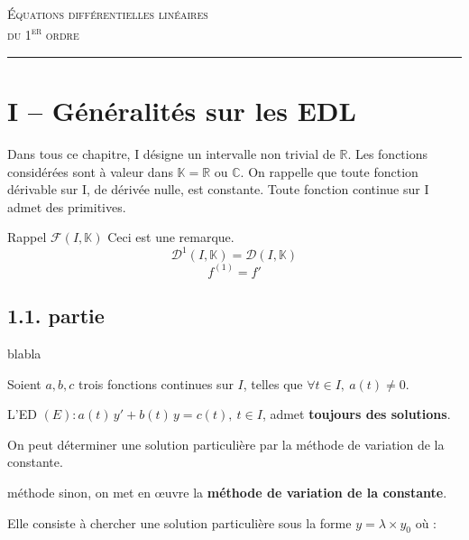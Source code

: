 \documentclass[a4paper,11pt]{article}
\newcommand{\mot}[1]{\textcolor{bordeaux}{\textbf{#1}}}
\begin{document}
\begin{center}
  {\LARGE\scshape\color{bordeaux} Équations différentielles linéaires\\[2pt] du 1\textsuperscript{er} ordre}\\[2pt]
  {\color{brun}\rule{0.45\linewidth}{0.8pt}}
\end{center}


\section*{I -- Généralités sur les EDL}
Dans tous ce chapitre, I désigne un intervalle non trivial de $\mathbb{R}$. 
Les fonctions considérées sont à valeur dans $\mathbb{K}=\mathbb{R}$ ou $\mathbb{C}$.
On rappelle que toute fonction dérivable sur I, de dérivée nulle, est constante. Toute fonction continue sur I admet des primitives.

\begin{remarque}{Rappel}
$\mathscr{F}(I,\mathbb{K})$ Ceci est une remarque.
\\

$$\mathscr{D}^{1}(I,\mathbb{K})=\mathscr{D}(I,\mathbb{K})$$
$$f^{(1)}=f'$$


\end{remarque}

\subsection*{1.1. partie}



blabla

\begin{theoreme}
Soient \(a, b, c\) trois fonctions continues sur \(I\), telles que \(\forall t \in I,\ a(t) \neq 0\).

L'ED \((E) : a(t)\,y' + b(t)\,y = c(t),\ t \in I\), admet \mot{toujours des solutions}.

On peut déterminer une solution particulière par la méthode de variation de la constante.
\end{theoreme}

\begin{methode}
méthode sinon, on met en œuvre la \mot{méthode de variation de la constante}.

Elle consiste à chercher une solution particulière sous la forme \(y = \lambda \times y_0\) où :
\end{methode}
\end{document}
